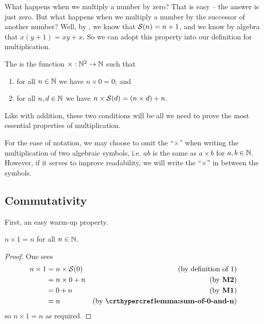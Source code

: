 What happens when we multiply a number by zero? That is easy -- the answer is just zero. But what happens when we multiply a number by the successor of another number? Well, by , we know that ${\mathcal{S}(n)} = n + 1$, and we know by algebra that $x(y + 1) = xy + x$. So we can adopt this property into our definition for multiplication.

\begin{definition}
    The  is the function $\times: \mathbb{N}^2 \to \mathbb{N}$ such that
    \begin{enumerate}[label=\textbf{M\arabic*.}]
        \item for all $n \in \mathbb{N}$ we have $n \times 0 = 0$; and
        \item for all $n, d \in \mathbb{N}$ we have $n \times {\mathcal{S}(d)} = (n \times d) + n$.
    \end{enumerate}
\end{definition}

Like with addition, these two conditions will be all we need to prove the most essential properties of multiplication.

For the ease of notation, we may choose to omit the ``$\times$'' when writing the multiplication of two algebraic symbols, i.e. $ab$ is the same as $a\times b$ for $a,b \in \mathbb{N}$. However, if it serves to improve readability, we will write the ``$\times$'' in between the symbols.

\subsection{Commutativity}
First, an easy warm-up property.

\begin{proposition}\label{prop:multiplication-by-1-right}
    $n \times 1 = n$ for all $n \in \mathbb{N}$.
\end{proposition}
\begin{proof}
    One sees
    \begin{align*}
        n \times 1 &= n \times \Successor{0} & (\text{by definition of 1})\\
        &= n \times 0 + n & (\text{by \textbf{M2}})\\
        &= 0 + n & (\text{by \textbf{M1}})\\
        &= n & (\text{by \myref{lemma:sum-of-0-and-n}})
    \end{align*}
    so $n \times 1 = n$ as required.
\end{proof}

